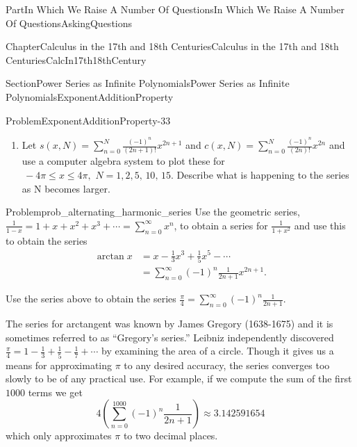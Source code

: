 \documentclass[oneside,10pt,]{book}
\numberwithin{equation}{part}
\newcommand{\amp}{&}
\begin{document}
\begin{partptx}{Part}{In Which We Raise A Number Of Questions}{}{In Which We Raise A Number Of Questions}{}{}{AskingQuestions}
\begin{chapterptx}{Chapter}{Calculus in the 17th and 18th Centuries}{}{Calculus in the 17th and 18th Centuries}{}{}{CalcIn17th18thCentury}
\begin{sectionptx}{Section}{Power Series as Infinite Polynomials}{}{Power Series as Infinite Polynomials}{}{}{ExponentAdditionProperty}
\begin{problem}{Problem}{}{ExponentAdditionProperty-33}
\begin{enumerate}[font=\bfseries,label=(\alph*),ref=\alph*]
\begin{align*}
\amp{}=\sum_{n=0}^\infty\frac{\left(-1\right)^n}{\left(2n+1\right)!}x^{2n+1}
\end{align*}
to obtain the series%
\begin{align*}
\cos
x\amp{}=1-\frac{1}{2!}\,x^2+\frac{1}{4!}x^4-\frac{1}{6!}x^6+\cdots\\
\amp{}=\sum_{n=0}^\infty\frac{\left(-1\right)^n}{\left(2n\right)!}x^{2n}.
\end{align*}
%
\item{}Let \(s(x,N)=\sum_{n=0}^N\frac{\left(-1\right)^n}{\left(2n+1\right)!}x^{2n+1}\) and \(c(x,N)=\sum_{n=0}^N\frac{\left(-1\right)^n}{\left(2n\right)!}x^{2n}\) and use a computer algebra system to plot these for\(\,-4\pi\leq x\leq
4\pi,\,\,N=1,2,5,\,10,\,15\).  Describe what is happening to the series as N becomes larger.%
\end{enumerate}%
\end{problem}
\begin{problem}{Problem}{}{prob_alternating_harmonic_series}%
Use the geometric series, \(\frac{1}{1-x}=1+x+x^2+x^3+\cdots=\sum_{n=0}^\infty x^n\), to obtain a series for \(\frac{1}{1+x^2}\) and use this to obtain the series%
\begin{align*}
\arctan
x\amp{}=x-\frac{1}{3}x^3+\frac{1}{5}x^5-\cdots\\
\amp{}=\sum_{n=0}^\infty(-1)^n
\frac{1}{2n+1}x^{2n+1}.
\end{align*}
%
\par
Use the series above to obtain the series \(\frac{\pi}{4}=\sum_{n=0}^\infty(-1)^n\frac{1}{2n+1}\).%
\end{problem}
The series for arctangent was known by James Gregory (1638-1675) and it is sometimes referred to as ``Gregory's series.'' Leibniz independently discovered \(\frac{\pi}{4}=1-\frac{1}{3}+\frac{1}{5}-\frac{1}{7}+\cdots\) by examining the area of a circle.  Though it gives us a means for approximating \(\pi\) to any desired accuracy, the series converges too slowly to be of any practical use. For example, if we compute the sum of the first \(1000\) terms we get%
\begin{equation*}
4\left(\sum_{n=0}^{1000}(-1)^n\frac{1}{2n+1}\right)\approx 3.142591654
\end{equation*}
which only approximates \(\pi\) to two decimal places.%
\par

\end{sectionptx}
\end{chapterptx}
\end{partptx}
\end{document}
